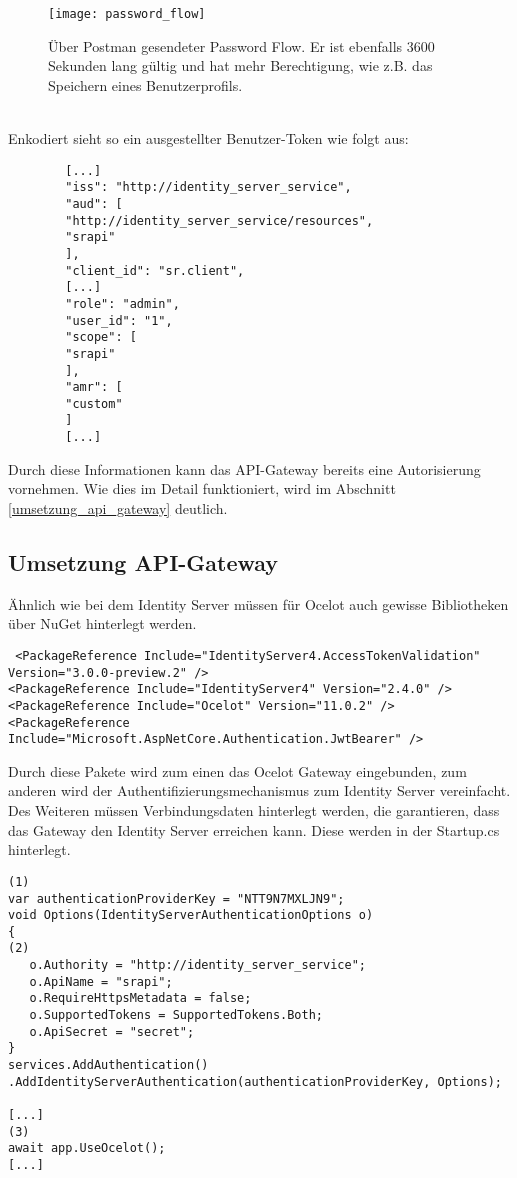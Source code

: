 \begin{figure}[!ht]
	\centering
	\texttt{[image: password\_flow]}
	\caption[Über Postman gesendeter Password Flow] {Über Postman gesendeter Password Flow. Er ist ebenfalls 3600 Sekunden lang gültig und hat mehr Berechtigung, wie z.B. das Speichern eines Benutzerprofils.}
	\label{fig:password_flow}
\end{figure} \\

Enkodiert sieht so ein ausgestellter Benutzer-Token wie folgt aus: \\

\begin{verbatim}
		[...]
		"iss": "http://identity_server_service",
		"aud": [
		"http://identity_server_service/resources",
		"srapi"
		],
		"client_id": "sr.client",
		[...]
		"role": "admin",
		"user_id": "1",
		"scope": [
		"srapi"
		],
		"amr": [
		"custom"
		]
		[...]
\end{verbatim}  

Durch diese Informationen kann das API-Gateway bereits eine Autorisierung vornehmen. Wie dies im Detail funktioniert, wird im Abschnitt \ref{umsetzung_api_gateway} deutlich. 

\subsection{Umsetzung API-Gateway}\label{sec:umsetzung_api_gateway}

Ähnlich wie bei dem Identity Server müssen für Ocelot auch gewisse Bibliotheken über NuGet hinterlegt werden.

\begin{verbatim}
 <PackageReference Include="IdentityServer4.AccessTokenValidation" Version="3.0.0-preview.2" />
<PackageReference Include="IdentityServer4" Version="2.4.0" />
<PackageReference Include="Ocelot" Version="11.0.2" />
<PackageReference Include="Microsoft.AspNetCore.Authentication.JwtBearer" />
\end{verbatim}

Durch diese Pakete wird zum einen das Ocelot Gateway eingebunden, zum anderen wird der Authentifizierungsmechanismus zum Identity Server vereinfacht. Des Weiteren müssen Verbindungsdaten hinterlegt werden, die garantieren, dass das Gateway den Identity Server erreichen kann. Diese werden in der Startup.cs hinterlegt.

\begin{verbatim}
(1)
var authenticationProviderKey = "NTT9N7MXLJN9";
void Options(IdentityServerAuthenticationOptions o)
{
(2)
   o.Authority = "http://identity_server_service";
   o.ApiName = "srapi";
   o.RequireHttpsMetadata = false;
   o.SupportedTokens = SupportedTokens.Both;
   o.ApiSecret = "secret";
}
services.AddAuthentication()
.AddIdentityServerAuthentication(authenticationProviderKey, Options);

[...]
(3)
await app.UseOcelot();
[...]
\end{verbatim}

